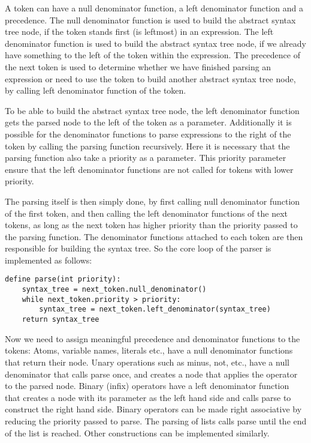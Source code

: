 \documentclass[11pt]{report}
\begin{document}
A token can have a null denominator function, a left denominator function and a precedence.
The null denominator function is used to build the abstract syntax tree node, if the token stands first (is leftmost) in an expression.
The left denominator function is used to build the abstract syntax tree node, if we already have something to the left of the token within the expression.
The precedence of the next token is used to determine whether we have finished parsing an expression or need to use the token to build another abstract syntax tree node, by calling left denominator function of the token.

To be able to build the abstract syntax tree node, the left denominator function gets the parsed node to the left of the token as a parameter. Additionally it is possible for the denominator functions to parse expressions to the right of the token by calling the parsing function recursively. Here it is necessary that the parsing function also take a priority as a parameter. This priority parameter ensure that the left denominator functions are not called for tokens with lower priority.

The parsing itself is then simply done, by first calling null denominator function of the first token, and then calling the left denominator functions of the next tokens, as long as the next token has higher priority than the priority passed to the parsing function.
The denominator functions attached to each token are then responsible for building the syntax tree.
So the core loop of the parser is implemented as follows:
\begin{verbatim}
define parse(int priority):
    syntax_tree = next_token.null_denominator()
    while next_token.priority > priority:
        syntax_tree = next_token.left_denominator(syntax_tree)
    return syntax_tree
\end{verbatim}

Now we need to assign meaningful precedence and denominator functions to the tokens:
Atoms, variable names, literals etc., have a null denominator functions that return their node. Unary operations such as minus, not, etc., have a null denominator that calls parse once, and creates a node that applies the operator to the parsed node.
Binary (infix) operators have a left denominator function that creates a node with its parameter as the left hand side and calls parse to construct the right hand side. Binary operators can be made right associative by reducing the priority passed to parse.
The parsing of lists calls parse until the end of the list is reached. Other constructions can be implemented similarly. 
\end{document}
